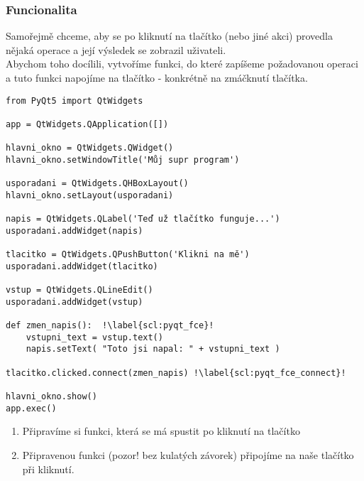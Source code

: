 \subsubsection{Funcionalita}
Samořejmě chceme, aby se po kliknutí na tlačítko (nebo jiné akci) provedla nějaká operace a její výsledek se zobrazil uživateli.\\
Abychom toho docílili, vytvoříme funkci, do které zapíšeme požadovanou operaci a tuto funkci napojíme na tlačítko - konkrétně na zmáčknutí tlačítka.\\

\begin{minipage}[t]{.45\textwidth}
\begin{code}
\begin{verbatim}
from PyQt5 import QtWidgets 

app = QtWidgets.QApplication([]) 

hlavni_okno = QtWidgets.QWidget() 
hlavni_okno.setWindowTitle('Můj supr program') 

usporadani = QtWidgets.QHBoxLayout() 
hlavni_okno.setLayout(usporadani) 

napis = QtWidgets.QLabel('Teď už tlačítko funguje...') 
usporadani.addWidget(napis) 

tlacitko = QtWidgets.QPushButton('Klikni na mě')
usporadani.addWidget(tlacitko) 

vstup = QtWidgets.QLineEdit()
usporadani.addWidget(vstup) 

def zmen_napis():  !\label{scl:pyqt_fce}!
	vstupni_text = vstup.text()
	napis.setText( "Toto jsi napal: " + vstupni_text )
	
tlacitko.clicked.connect(zmen_napis) !\label{scl:pyqt_fce_connect}!

hlavni_okno.show() 
app.exec() 
\end{verbatim}

\label{code:grafika_pyqt_funkcionalita}
\end{code}
\end{minipage}
\begin{minipage}[t]{.45\textwidth}
\begin{enumerate}
\item[ř. \ref{scl:pyqt_fce}:] Připravíme si funkci, která se má spustit po kliknutí na tlačítko
\item[ř. \ref{scl:pyqt_fce_connect}:] Připravenou funkci (pozor! bez kulatých závorek) připojíme na naše tlačítko při kliknutí.
\end{enumerate}
\end{minipage}

